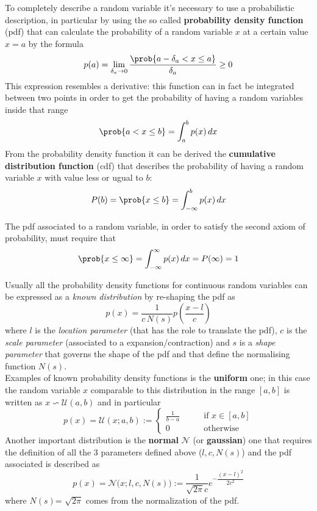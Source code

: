 	To completely describe a random variable it's necessary to use a probabilistic description, in particular by using the so called \textbf{probability density function} (pdf) that can calculate the probability of a random variable $x$ at a certain value $x=a$ by the formula
	\[ p(a) = \lim_{\delta_a \rightarrow 0} \frac{\prob{a-\delta_a < x \leq a}}{\delta_a} \geq 0 \]
	This expression resembles a derivative: this function can in fact be integrated between two points in order to get the probability of having a random variables inside that range
	\[ \prob{a< x \leq b} = \int_a ^b p(x)\, dx \]
	From the probability density function it can be derived the \textbf{cumulative distribution function} (cdf) that describes the probability of having a random variable $x$ with value less or ugual to $b$:
	\[ P(b) = \prob{x\leq b} = \int_{-\infty}^b p(x)\, dx\]
	
	The pdf associated to a random variable, in order to satisfy the second axiom of probability, must require that
	\[ \prob{x\leq \infty} = \int_{-\infty}^\infty p(x)\, dx = P(\infty) = 1\] 
	\vspace{3mm}
	
	Usually all the probability density functions for continuous random variables can be expressed as a \textit{known distribution} by re-shaping the pdf as
	\[ p(x) = \frac{1}{c\, N(s)} p\left(\frac{x-l}{c}\right)\]
	where $l$ is the \textit{location parameter} (that has the role to translate the pdf), $c$ is the \textit{scale parameter} (associated to a expansion/contraction) and $s$ is a \textit{shape parameter} that governs the shape of the pdf and that define the normalising function $N(s)$.\\
	Examples of known probability density functions is the \textbf{uniform} one; in this case the random variable $x$ comparable to this distribution in the range $[a,b]$ is written as $x\backsim \mathcal U(a,b)$ and in particular
	\[ p(x) = \mathcal U(x; a,b) := \begin{cases}
		\frac 1{b-a} \qquad & \textrm{if } x\in [a,b] \\ 0 & \textrm{otherwise}
	\end{cases} \]
	Another important distribution is the \textbf{normal} $\mathcal N$ (or \textbf{gaussian}) one that requires the definition of all the 3 parameters defined above ($l, c,N(s)$) and the pdf associated is described as
	\[ p(x) = \mathcal N\big(x; l, c, N(s)\big) := \frac{1}{\sqrt{2\pi} c} e^{-\dfrac{(x-l)^2}{2c^2}} \]
	where $N(s)$= $\sqrt{2\pi}$ comes from the normalization of the pdf.
	\vspace{3mm}
	
